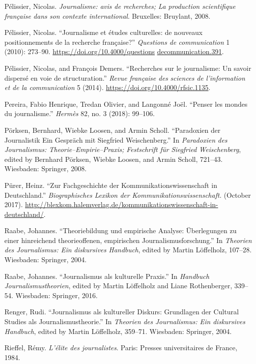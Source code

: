 \documentclass{tufte-handout}
\begin{document}
\begin{hangparas}{.25in}{1}
Pélissier, Nicolas. \emph{Journalisme: avis de recherches; La production
scientifique française dans son contexte international}. Bruxelles:
Bruylant, 2008.

Pélissier, Nicolas. ``Journalisme et études culturelles: de nouveaux
positionnements de la recherche française?'' \emph{Questions de
communication} 1 (2010): 273--90. \href{https://doi.org/10.4000/questionsdecommunication.391}{https://doi.org/10.4000/questions} \href{https://doi.org/10.4000/questionsdecommunication.391}{decommunication.391}.

Pélissier, Nicolas, and François Demers. ``Recherches sur le
journalisme: Un savoir dispersé en voie de structuration.'' \emph{Revue
française des sciences de l'information et de la communication} 5
(2014). \url{https://doi.org/10.4000/rfsic.1135}.

Pereira, Fabio Henrique, Tredan Olivier, and Langonné Joël. ``Penser les
mondes du journalisme.'' \emph{Hermès} 82, no. 3 (2018): 99--106.

Pörksen, Bernhard, Wiebke Loosen, and Armin Scholl. ``Paradoxien der
Journalistik Ein Gespräch mit Siegfried Weischenberg.'' In
\emph{Paradoxien des Journalismus: Theorie--Empirie--Praxis; Festschrift
für Siegfried Weischenberg}, edited by Bernhard Pörksen, Wiebke Loosen,
and Armin Scholl, 721--43. Wiesbaden: Springer, 2008.

Pürer, Heinz. ``Zur Fachgeschichte der Kommunikationswissenschaft in
Deutschland.'' \emph{Biographisches Lexikon der
Kommunikationswissenschaft.} (October 2017).
\url{http://blexkom.halemverlag.de/kommunikationswissenschaft-in-deutschland/}.

Raabe, Johannes. ``Theoriebildung und empirische Analyse: Überlegungen
zu einer hinreichend theorieoffenen, empirischen
Journalismusforschung.'' In \emph{Theorien des Journalismus: Ein
diskursives Handbuch}, edited by Martin Löffelholz, 107--28. Wiesbaden:
Springer, 2004.

Raabe, Johannes. ``Journalismus als kulturelle Praxis.'' In
\emph{Handbuch Journalismustheorien}, edited by Martin Löffelholz and
Liane Rothenberger, 339--54. Wiesbaden: Springer, 2016.

Renger, Rudi. ``Journalismus als kultureller Diskurs: Grundlagen der
Cultural Studies als Journalismustheorie.'' In \emph{Theorien des
Journalismus: Ein diskursives Handbuch}, edited by Martin Löffelholz,
359--71. Wiesbaden: Springer, 2004.

Rieffel, Rémy. \emph{L'élite des journalistes}. Paris: Presses
universitaires de France, 1984.


\end{hangparas}
\end{document}
